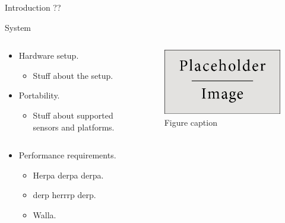 \documentclass[final,hyperref={pdfpagelabels=false}]{beamer}
\begin{document}
\begin{frame}[t]
\begin{columns}[t]
\begin{column}{.465\textwidth}
\begin{block}{Introduction ??}
\end{block}


\begin{block}{System}

\begin{columns} %
\begin{column}{.54\textwidth} %
\begin{itemize}
\item Hardware setup.
\begin{itemize}
\item Stuff about the setup.
\end{itemize}
\item Portability.
\begin{itemize}
\item Stuff about supported sensors and platforms.
\end{itemize}
\end{itemize}
\end{column}

\begin{column}{.43\textwidth} %
\centering
\begin{figure}
\includegraphics[width=0.8\linewidth]{placeholder.jpg}
\caption{Figure caption}
\end{figure}
\end{column}
\end{columns} %

\begin{itemize}
\item Performance requirements.
\begin{itemize}
\item Herpa derpa derpa.
\item derp herrrp derp.
\item Walla.
\end{itemize}
\end{itemize}


\end{block}
\end{column}
\end{columns}
\end{frame}
\end{document}
